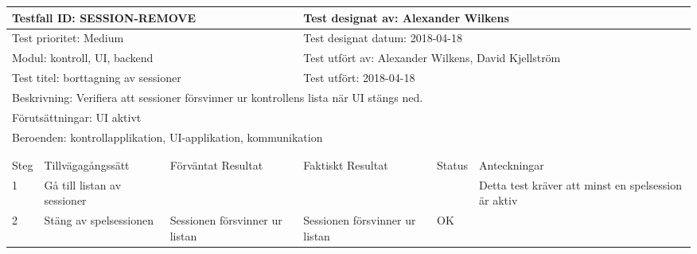 



\begin{tabular}{| p{1cm}|  p{3cm} | p{3cm}| p{3cm}| p{2cm}| p{3cm}|}
	  \hline
	  \multicolumn{3}{|l|}{Testfall ID: SESSION-REMOVE}&\multicolumn{3}{|l|}{Test designat av: Alexander Wilkens}\\
	  \hline
	  \multicolumn{3}{|l|}{Test prioritet: Medium}&\multicolumn{3}{|l|}{Test designat datum: 2018-04-18}\\
	  \hline
	  \multicolumn{3}{|l|}{Modul: kontroll, UI, backend}&\multicolumn{3}{|l|}{Test utfört av: Alexander Wilkens, David Kjellström}\\
	  \hline
	  \multicolumn{3}{|l|}{Test titel: borttagning av sessioner}&\multicolumn{3}{|l|}{Test utfört: 2018-04-18}\\
	  \hline
	  \multicolumn{6}{|p{\textwidth}|}{Beskrivning: Verifiera att sessioner försvinner ur kontrollens lista när UI stängs ned.}\\
	  \hline
	  \multicolumn{6}{|p{\textwidth}|}{Förutsättningar: UI aktivt}\\
	  \hline
	  \multicolumn{6}{|p{\textwidth}|}{Beroenden: kontrollapplikation, UI-applikation, kommunikation}\\
  
	\hline
	\multicolumn{6}{|l|}{}\\
	\multicolumn{6}{|l|}{}\\
      	\hline
	Steg&Tillvägagångssätt&Förväntat Resultat&Faktiskt Resultat&Status&Anteckningar \\
	\hline
	1&Gå till listan av sessioner&&&&Detta test kräver att minst en spelsession är aktiv\\
      	\hline
	2&Stäng av spelsessionen&Sessionen försvinner ur listan&Sessionen försvinner ur listan&OK&\\
      	\hline
\end{tabular}



